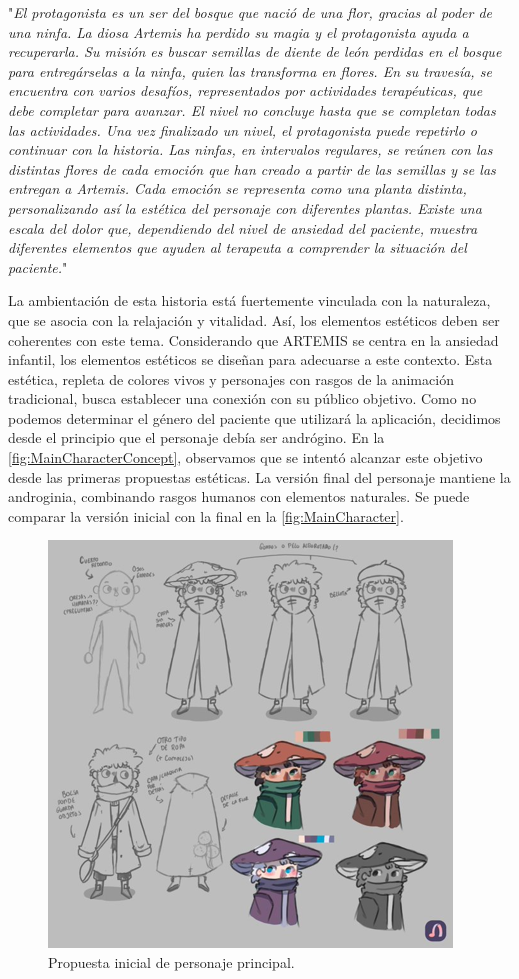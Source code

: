 \begin{adjustwidth}{100pt}{0pt}
	\noindent "\textit{El protagonista es un ser del bosque que nació de una flor, gracias al poder de una ninfa. La diosa Artemis ha perdido su magia y el protagonista ayuda a recuperarla. Su misión es buscar semillas de diente de león perdidas en el bosque para entregárselas a la ninfa, quien las transforma en flores. En su travesía, se encuentra con varios desafíos, representados por actividades terapéuticas, que debe completar para avanzar. El nivel no concluye hasta que se completan todas las actividades. Una vez finalizado un nivel, el protagonista puede repetirlo o continuar con la historia. Las ninfas, en intervalos regulares, se reúnen con las distintas flores de cada emoción que han creado a partir de las semillas y se las entregan a Artemis. Cada emoción se representa como una planta distinta, personalizando así la estética del personaje con diferentes plantas. Existe una escala del dolor que, dependiendo del nivel de ansiedad del paciente, muestra diferentes elementos que ayuden al terapeuta a comprender la situación del paciente.}"
\end{adjustwidth}

La ambientación de esta historia está fuertemente vinculada con la naturaleza, que se asocia con la relajación y vitalidad. Así, los elementos estéticos deben ser coherentes con este tema. Considerando que ARTEMIS se centra en la ansiedad infantil, los elementos estéticos se diseñan para adecuarse a este contexto. Esta estética, repleta de colores vivos y personajes con rasgos de la animación tradicional, busca establecer una conexión con su público objetivo. Como no podemos determinar el género del paciente que utilizará la aplicación, decidimos desde el principio que el personaje debía ser andrógino. En la \autoref{fig:MainCharacterConcept}, observamos que se intentó alcanzar este objetivo desde las primeras propuestas estéticas. La versión final del personaje mantiene la androginia, combinando rasgos humanos con elementos naturales. Se puede comparar la versión inicial con la final en la \autoref{fig:MainCharacter}.

\begin{figure}[h!]
	\centering
	\includegraphics[width=0.4\linewidth]{Figuras/Desarrollo/PersonajesNuevosConcept}
	\caption{Propuesta inicial de personaje principal.}
	\label{fig:MainCharacterConcept}
	\vspace{-20pt}
\end{figure}

